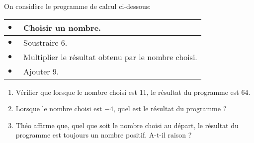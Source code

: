
\medskip 

On considère le programme de calcul ci-dessous: 

\medskip
\begin{center}
\begin{tabularx}{0.71\linewidth}{|lX|}\hline 
$\bullet~~$&Choisir un nombre.\\ \hline 
$\bullet~~$&Soustraire 6. \\ \hline 
$\bullet~~$&Multiplier le résultat obtenu par le nombre choisi.\\ \hline 
$\bullet~~$&Ajouter 9. \\ \hline 
\end{tabularx}
\end{center}

\begin{enumerate}
\item Vérifier que lorsque le nombre choisi est 11, le résultat du programme est 64. 
\item Lorsque le nombre choisi est $- 4$, quel est le résultat du programme ? 
\item Théo affirme que, quel que soit le nombre choisi au départ, le résultat du programme est toujours un nombre positif. A-t-il raison ? 
\end{enumerate}

\vspace{0.5cm}

